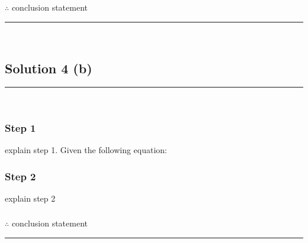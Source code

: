 \subsubsection*{\normalfont}{$\therefore$ conclusion statement}

\noindent\rule{\textwidth}{0.4pt}\\

\subsection*{Solution 4 (b)}
\noindent\rule{\textwidth}{0.4pt}\\

\subsubsection*{Step 1}
\parbox{\textwidth}{

explain step 1.
Given the following equation:\\

}

\subsubsection*{Step 2}
\parbox{\textwidth}{

explain step 2\\

}

\subsubsection*{\normalfont}{$\therefore$ conclusion statement}

\noindent\rule{\textwidth}{0.4pt}\\


